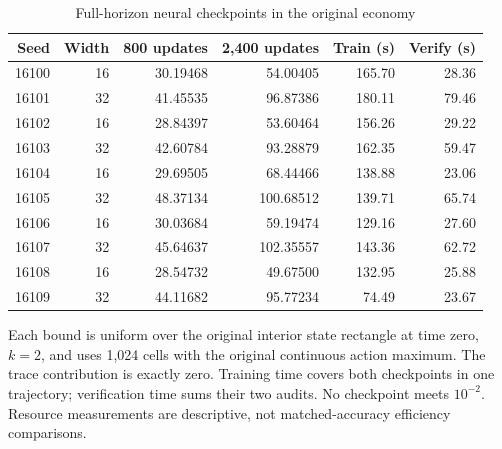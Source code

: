 \begin{table}[htbp]\centering\small
\caption{Full-horizon neural checkpoints in the original economy}\label{tab:r16neural}
\begin{tabular}{rrrrrr}
\toprule
Seed & Width & 800 updates & 2,400 updates & Train (s) & Verify (s)\\\midrule
16100 & 16 & 30.19468 & 54.00405 & 165.70 & 28.36\\
16101 & 32 & 41.45535 & 96.87386 & 180.11 & 79.46\\
16102 & 16 & 28.84397 & 53.60464 & 156.26 & 29.22\\
16103 & 32 & 42.60784 & 93.28879 & 162.35 & 59.47\\
16104 & 16 & 29.69505 & 68.44466 & 138.88 & 23.06\\
16105 & 32 & 48.37134 & 100.68512 & 139.71 & 65.74\\
16106 & 16 & 30.03684 & 59.19474 & 129.16 & 27.60\\
16107 & 32 & 45.64637 & 102.35557 & 143.36 & 62.72\\
16108 & 16 & 28.54732 & 49.67500 & 132.95 & 25.88\\
16109 & 32 & 44.11682 & 95.77234 & 74.49 & 23.67\\
\bottomrule\end{tabular}
\par\smallskip\footnotesize Each bound is uniform over the original interior state rectangle at time zero, $k=2$, and uses 1,024 cells with the original continuous action maximum. The trace contribution is exactly zero. Training time covers both checkpoints in one trajectory; verification time sums their two audits. No checkpoint meets $10^{-2}$. Resource measurements are descriptive, not matched-accuracy efficiency comparisons.
\end{table}
